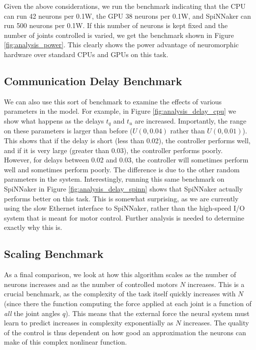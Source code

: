 \documentclass{frontiersSCNS} %
\begin{document}
Given the above considerations, we run the benchmark indicating that the CPU can run 42 neurons per 0.1W,
the GPU 38 neurons per 0.1W, and SpiNNaker can run 500 neurons per 0.1W.  If
this number of neurons is kept fixed and the number of joints controlled is
varied, we get the benchmark shown in Figure \ref{fig:analysis_power}.  This clearly
shows the power advantage of neuromorphic hardware over standard CPUs and
GPUs on this task.

\subsection{Communication Delay Benchmark}

We can also use this sort of benchmark to examine the effects of various
parameters in the model.  For example, in Figure \ref{fig:analysis_delay_cpu}
we show what happens as the delays $t_q$ and $t_u$ are increased.
Importantly, the range on these parameters is larger than before ($U(0, 0.04)$
rather than $U(0, 0.01)$).  This shows that if the delay is short (less than 0.02), the controller performs well, and if it is very large (greater than 0.03),
the controller performs poorly.  However, for delays between 0.02 and 0.03,
the controller will sometimes perform well and sometimes perform poorly.  The
difference is due to the other random parameters in the system.  Interestingly,
running this same benchmark on SpiNNaker in Figure \ref{fig:analysis_delay_spinn} shows that SpiNNaker actually performs better on this
task.  This is somewhat surprising, as we are currently using the slow
Ethernet interface to SpiNNaker, rather than the high-speed I/O system that
is meant for motor control.  Further analysis is needed to determine exactly why this is.

\subsection{Scaling Benchmark}

As a final comparison, we look at how this algorithm scales as the number
of neurons increases and as the number of controlled motors $N$ increases.  This
is a crucial benchmark, as the complexity of the task itself quickly
increases with $N$ (since there the function computing the force applied
at each joint is a function of \emph{all} the joint angles $q$).  This means
that the external force the neural system must learn to predict increases
in complexity exponentially as $N$ increases.  The quality of the control
is thus dependent on how good an approximation the neurons can make of this
complex nonlinear function.
\end{document}
